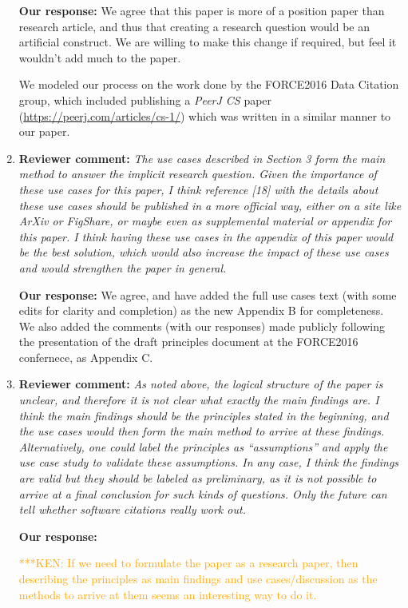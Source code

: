 \documentclass{article}
\newcommand{\niemnote}[1]{ {\textcolor{orange} { ***KEN: #1 }}} %
\begin{document}
\begin{enumerate}
\textbf{Our response:}
We agree that this paper is more of a position paper than research article, and thus that creating a research question would be an artificial construct. We are willing to make this change if required, but feel it wouldn't add much to the paper.

We modeled our process on the work done by the FORCE2016 Data Citation group, which included publishing a \emph{PeerJ CS} paper (\url{https://peerj.com/articles/cs-1/}) which was written in a similar manner to our paper.

\item \textbf{Reviewer comment:}
\emph{The use cases described in Section 3 form the main method to answer the implicit research question. Given the importance of these use cases for this paper, I think reference [18] with the details about these use cases should be published in a more official way, either on a site like ArXiv or FigShare, or maybe even as supplemental material or appendix for this paper. I think having these use cases in the appendix of this paper would be the best solution, which would also increase the impact of these use cases and would strengthen the paper in general.}

\textbf{Our response:}
We agree, and have added the full use cases text (with some edits for clarity and completion) as the new Appendix B for completeness.
We also added the comments (with our responses) made publicly following the presentation of the draft principles document at the FORCE2016 confernece, as Appendix C.


\item \textbf{Reviewer comment:}
\emph{As noted above, the logical structure of the paper is unclear, and therefore it is not clear what exactly the main findings are. I think the main findings should be the principles stated in the beginning, and the use cases would then form the main method to arrive at these findings. Alternatively, one could label the principles as ``assumptions'' and apply the use case study to validate these assumptions. In any case, I think the findings are valid but they should be labeled as preliminary, as it is not possible to arrive at a final conclusion for such kinds of questions. Only the future can tell whether software citations really work out.}

\textbf{Our response:}

\niemnote{If we need to formulate the paper as a research paper, then describing the principles as main findings and use cases\slash discussion as the methods to arrive at them seems an interesting way to do it.}


\end{enumerate}
\end{document}
